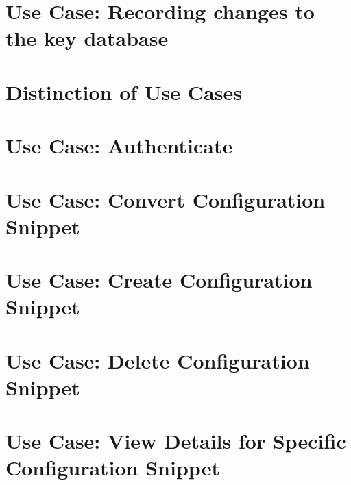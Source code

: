 \let\mypdfximage\pdfximage\def\pdfximage{\immediate\mypdfximage}\documentclass[twoside]{book}
\newcommand{\+}{\discretionary{\mbox{\scriptsize$\hookleftarrow$}}{}{}}
\begin{document}
\chapter{Use Case\+: Recording changes to the key database}
\label{doc_usecases_record_elektra_UC_record_changes_md}

\chapter{Distinction of Use Cases}
\label{doc_usecases_snippet_sharing_distinction_use_cases_md}

\chapter{Use Case\+: Authenticate}
\label{doc_usecases_snippet_sharing_UC_authenticate_md}

\chapter{Use Case\+: Convert Configuration Snippet}
\label{doc_usecases_snippet_sharing_UC_convert_snippet_md}

\chapter{Use Case\+: Create Configuration Snippet}
\label{doc_usecases_snippet_sharing_UC_create_snippet_md}

\chapter{Use Case\+: Delete Configuration Snippet}
\label{doc_usecases_snippet_sharing_UC_delete_snippet_md}

\chapter{Use Case\+: View Details for Specific Configuration Snippet}
\label{doc_usecases_snippet_sharing_UC_details_snippet_md}

\end{document}
